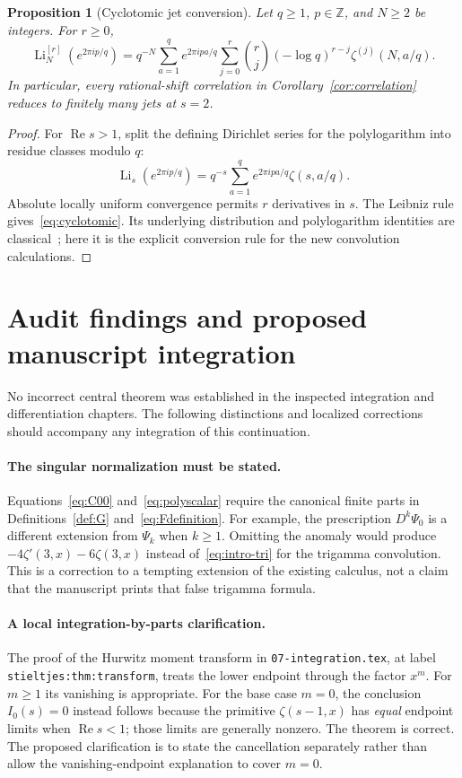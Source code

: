 \documentclass[11pt]{article}
\numberwithin{equation}{section}
\newtheorem{proposition}[theorem]{Proposition}
\theoremstyle{definition}
\theoremstyle{remark}
\DeclareMathOperator{\Li}{Li}
\DeclareMathOperator{\Rea}{Re}
\newcommand{\Z}{\mathbb Z}
\begin{document}
\begin{proposition}[Cyclotomic jet conversion]\label{prop:cyclotomic}
Let $q\ge1$, $p\in\Z$, and $N\ge2$ be integers. For $r\ge0$,
\begin{equation}\label{eq:cyclotomic}
 \Li_N^{[r]}(e^{2\pi ip/q})
 =q^{-N}\sum_{a=1}^q e^{2\pi ipa/q}
     \sum_{j=0}^r\binom rj(-\log q)^{r-j}\zeta^{(j)}(N,a/q).
\end{equation}
In particular, every rational-shift correlation in
Corollary~\ref{cor:correlation} reduces to finitely many jets at $s=2$.
\end{proposition}
\begin{proof}
For $\Rea s>1$, split the defining Dirichlet series for the polylogarithm
into residue classes modulo $q$:
\[
 \Li_s(e^{2\pi ip/q})
 =q^{-s}\sum_{a=1}^q e^{2\pi ipa/q}\zeta(s,a/q).
\]
Absolute locally uniform convergence permits $r$ derivatives in $s$.
The Leibniz rule gives~\eqref{eq:cyclotomic}. Its underlying distribution
and polylogarithm identities are classical~\cite{DLMFHz,DLMFLi}; here it
is the explicit conversion rule for the new convolution calculations.
\end{proof}

\section{Audit findings and proposed manuscript integration}
\label{sec:audit}
No incorrect central theorem was established in the inspected integration
and differentiation chapters. The following distinctions and localized
corrections should accompany any integration of this continuation.

\paragraph{The singular normalization must be stated.}
Equations~\eqref{eq:C00} and~\eqref{eq:polyscalar} require the canonical
finite parts in Definitions~\ref{def:G} and~\eqref{eq:Fdefinition}.
For example, the prescription $D^k\Psi_0$ is a different extension from
$\Psi_k$ when $k\ge1$. Omitting the anomaly would produce
$-4\zeta'(3,x)-6\zeta(3,x)$ instead of~\eqref{eq:intro-tri} for the
trigamma convolution. This is a correction to a tempting extension of
the existing calculus, not a claim that the manuscript prints that false
trigamma formula.

\paragraph{A local integration-by-parts clarification.}
The proof of the Hurwitz moment transform in
\texttt{07-integration.tex}, at label
\texttt{stieltjes:thm:transform}, treats the lower endpoint through the
factor $x^m$. For $m\ge1$ its vanishing is appropriate. For the base
case $m=0$, the conclusion $I_0(s)=0$ instead follows because the
primitive $\zeta(s-1,x)$ has \emph{equal} endpoint limits when
$\Rea s<1$; those limits are generally nonzero. The theorem is correct.
The proposed clarification is to state the cancellation separately rather
than allow the vanishing-endpoint explanation to cover $m=0$.
\end{document}
